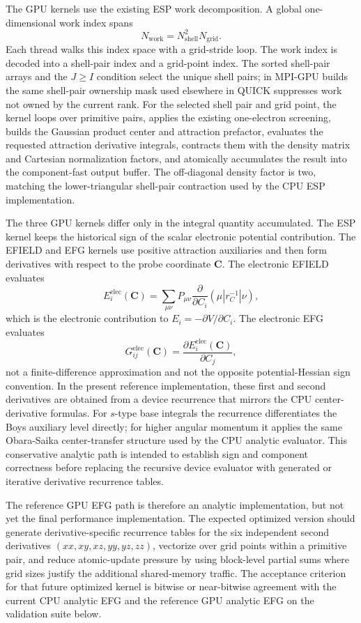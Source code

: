 \documentclass[journal=jcisd8,manuscript=suppinfo]{achemso}
\begin{document}
The GPU kernels use the existing ESP work decomposition.  A global one-dimensional work index spans
\[
  N_{\mathrm{work}} = N_{\mathrm{shell}}^2 N_{\mathrm{grid}}.
\]
Each thread walks this index space with a grid-stride loop.  The work index is decoded into a shell-pair index and a grid-point index.  The sorted shell-pair arrays and the \(J\ge I\) condition select the unique shell pairs; in MPI-GPU builds the same shell-pair ownership mask used elsewhere in QUICK suppresses work not owned by the current rank.  For the selected shell pair and grid point, the kernel loops over primitive pairs, applies the existing one-electron screening, builds the Gaussian product center and attraction prefactor, evaluates the requested attraction derivative integrals, contracts them with the density matrix and Cartesian normalization factors, and atomically accumulates the result into the component-fast output buffer.  The off-diagonal density factor is two, matching the lower-triangular shell-pair contraction used by the CPU ESP implementation.

The three GPU kernels differ only in the integral quantity accumulated.  The ESP kernel keeps the historical sign of the scalar electronic potential contribution.  The EFIELD and EFG kernels use positive attraction auxiliaries and then form derivatives with respect to the probe coordinate \(\mathbf{C}\).  The electronic EFIELD evaluates
\[
  E_i^{\mathrm{elec}}(\mathbf{C})
  =
  \sum_{\mu\nu} P_{\mu\nu}
  \frac{\partial}{\partial C_i}
  (\mu|r_C^{-1}|\nu),
\]
which is the electronic contribution to \(E_i=-\partial V/\partial C_i\).  The electronic EFG evaluates
\[
  G_{ij}^{\mathrm{elec}}(\mathbf{C})
  = \frac{\partial E_i^{\mathrm{elec}}(\mathbf{C})}{\partial C_j},
\]
not a finite-difference approximation and not the opposite potential-Hessian sign convention.  In the present reference implementation, these first and second derivatives are obtained from a device recurrence that mirrors the CPU center-derivative formulas.  For \(s\)-type base integrals the recurrence differentiates the Boys auxiliary level directly; for higher angular momentum it applies the same Obara-Saika center-transfer structure used by the CPU analytic evaluator.  This conservative analytic path is intended to establish sign and component correctness before replacing the recursive device evaluator with generated or iterative derivative recurrence tables.

The reference GPU EFG path is therefore an analytic implementation, but not yet the final performance implementation.  The expected optimized version should generate derivative-specific recurrence tables for the six independent second derivatives \((xx,xy,xz,yy,yz,zz)\), vectorize over grid points within a primitive pair, and reduce atomic-update pressure by using block-level partial sums where grid sizes justify the additional shared-memory traffic.  The acceptance criterion for that future optimized kernel is bitwise or near-bitwise agreement with the current CPU analytic EFG and the reference GPU analytic EFG on the validation suite below.
\end{document}
